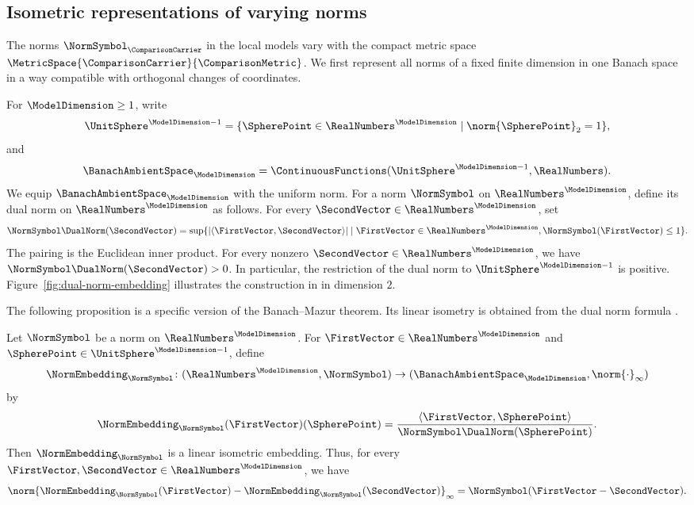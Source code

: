 \subsection{Isometric representations of varying norms}\label{subsec:ar-norm-representations}
The norms
$\NormSymbol_\ComparisonCarrier$
in the local models vary with the compact metric space
$\MetricSpace{\ComparisonCarrier}{\ComparisonMetric}$.
We first represent all norms of a fixed finite dimension in one Banach
space in a way compatible with orthogonal changes of coordinates.

For
$\ModelDimension \geq1$,
write
\[
 \UnitSphere^{\ModelDimension -1}=\{\SpherePoint \in\RealNumbers^\ModelDimension \mid\norm{\SpherePoint }_2=1\},
\]
and
\[
 \BanachAmbientSpace _\ModelDimension =\ContinuousFunctions(\UnitSphere^{\ModelDimension -1},\RealNumbers).
\]
We equip
$\BanachAmbientSpace _\ModelDimension $
with the uniform norm.
For a norm
$\NormSymbol $
on
$\RealNumbers^\ModelDimension $,
define its dual norm on
$\RealNumbers^\ModelDimension$
as follows.
For every
$\SecondVector\in\RealNumbers^\ModelDimension$,
set
\[
 \NormSymbol\DualNorm(\SecondVector)
 =\sup\{|\langle\FirstVector,\SecondVector\rangle|
       \mid\FirstVector\in\RealNumbers^\ModelDimension,
            \NormSymbol(\FirstVector)\leq1\}.
\]
The pairing is the Euclidean inner product.
For every nonzero
$\SecondVector\in\RealNumbers^\ModelDimension$,
we have
$\NormSymbol\DualNorm(\SecondVector)>0$.
In particular,
the restriction of the dual norm to
$\UnitSphere^{\ModelDimension-1}$
is positive.
Figure~\ref{fig:dual-norm-embedding} illustrates the construction in
 in dimension
$2$.



The following proposition is a specific version of the Banach--Mazur theorem.
Its linear isometry is obtained from the dual norm formula
\cite[Proposition~11.21]{Muscat2024}.

\begin{proposition}\label{lem:dual-representation}
Let
$\NormSymbol $
be a norm on
$\RealNumbers^\ModelDimension $.
For
$\FirstVector\in\RealNumbers^\ModelDimension$
and
$\SpherePoint\in\UnitSphere^{\ModelDimension-1}$,
define
\[
 \NormEmbedding _\NormSymbol \colon(\RealNumbers^\ModelDimension ,\NormSymbol )\to(\BanachAmbientSpace _\ModelDimension ,\norm{\cdot}_\infty)
\]
by
\begin{equation}\label{eq:dual-embedding}
 \NormEmbedding _\NormSymbol (\FirstVector )(\SpherePoint )=\frac{\langle \FirstVector ,\SpherePoint \rangle}{\NormSymbol \DualNorm(\SpherePoint )}.
\end{equation}
Then
$\NormEmbedding_\NormSymbol$
is a linear isometric embedding.
Thus,
for every
$\FirstVector,\SecondVector\in\RealNumbers^\ModelDimension$,
we have
\begin{equation}\label{eq:dual-isometry}
 \norm{\NormEmbedding _\NormSymbol (\FirstVector )-\NormEmbedding _\NormSymbol (\SecondVector )}_\infty=\NormSymbol (\FirstVector -\SecondVector ).
\end{equation}
\end{proposition}

